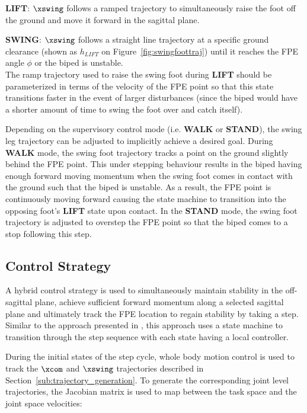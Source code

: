 \textbf{LIFT}: $\xswing$ follows a ramped trajectory to simultaneously raise the foot off the ground and move it forward in the sagittal plane.

\textbf{SWING}: $\xswing$ follows a straight line trajectory at a specific ground clearance (shown as $h_{LIFT}$ on Figure~\ref{fig:swingfoottraj}) until it reaches the FPE angle $\phi$ or the biped is unstable. \\

The ramp trajectory used to raise the swing foot during \textbf{LIFT} should be parameterized in terms of the velocity of the FPE point so that this state transitions faster in the event of larger disturbances (since the biped would have a shorter amount of time to swing the foot over and catch itself).

Depending on the supervisory control mode (i.e. \textbf{WALK} or \textbf{STAND}), the swing leg trajectory can be adjusted to implicitly achieve a desired goal. During \textbf{WALK} mode, the swing foot trajectory tracks a point on the ground slightly behind the FPE point. This under stepping behaviour results in the biped having enough forward moving momentum when the swing foot comes in contact with the ground such that the biped is unstable. As a result, the FPE point is continuously moving forward causing the state machine to transition into the opposing foot's \textbf{LIFT} state upon contact. In the \textbf{STAND} mode, the swing foot trajectory is adjusted to overstep the FPE point so that the biped comes to a stop following this step.


\subsection{Control Strategy} %
\label{sub:control_strategy}

A hybrid control strategy is used to simultaneously maintain stability in the off-sagittal plane, achieve sufficient forward momentum along a selected sagittal plane and ultimately track the FPE location to regain stability by taking a step. Similar to the approach presented in \cite{Wight:2008vt}, this approach uses a state machine to transition through the step sequence with each state having a local controller.

During the initial states of the step cycle, whole body motion control is used to track the $\xcom$ and $\xswing$ trajectories described in  Section~\ref{sub:trajectory_generation}. To generate the corresponding joint level trajectories, the Jacobian matrix is used to map between the task space and the joint space velocities:

